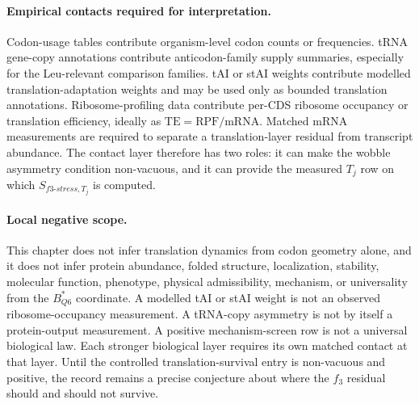 \paragraph{Empirical contacts required for interpretation.}
Codon-usage tables contribute organism-level codon counts or frequencies.  tRNA gene-copy annotations contribute anticodon-family supply summaries, especially for the Leu-relevant comparison families.  tAI or stAI weights contribute modelled translation-adaptation weights and may be used only as bounded translation annotations.  Ribosome-profiling data contribute per-CDS ribosome occupancy or translation efficiency, ideally as $\mathrm{TE}=\mathrm{RPF}/\mathrm{mRNA}$.  Matched mRNA measurements are required to separate a translation-layer residual from transcript abundance.  The contact layer therefore has two roles: it can make the wobble asymmetry condition non-vacuous, and it can provide the measured $T_j$ row on which $S_{f3\text{-}stress,T_j}$ is computed.

\paragraph{Local negative scope.}
This chapter does not infer translation dynamics from codon geometry alone, and it does not infer protein abundance, folded structure, localization, stability, molecular function, phenotype, physical admissibility, mechanism, or universality from the $B^{*}_{Q6}$ coordinate.  A modelled tAI or stAI weight is not an observed ribosome-occupancy measurement.  A tRNA-copy asymmetry is not by itself a protein-output measurement.  A positive mechanism-screen row is not a universal biological law.  Each stronger biological layer requires its own matched contact at that layer.  Until the controlled translation-survival entry is non-vacuous and positive, the record remains a precise conjecture about where the $f_3$ residual should and should not survive.
